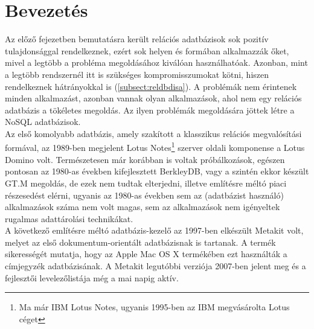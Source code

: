 \section{Bevezetés}

Az előző fejezetben bemutatásra került relációs adatbázisok sok pozitív tulajdonsággal rendelkeznek, ezért sok helyen és formában alkalmazzák őket, mivel a legtöbb a probléma megoldásához kiválóan használhatóak.
Azonban, mint a legtöbb rendszernél itt is szükséges kompromisszumokat kötni, hiszen rendelkeznek hátrányokkal is (\ref{subsect:reldbdisa}). A problémák nem érintenek minden alkalmazást, azonban vannak olyan alkalmazások, ahol nem egy relációs adatbázis a tökéletes megoldás. Az ilyen problémák megoldására jöttek létre a NoSQL adatbázisok.
\hfill\\
Az első komolyabb adatbázis, amely szakított a klasszikus relációs megvalósítási formával, az 1989-ben megjelent Lotus Notes\footnote{Ma már IBM Lotus Notes, ugyanis 1995-ben az IBM megvásárolta Lotus céget} szerver oldali komponense a Lotus Domino volt. Természetesen már korábban is voltak próbálkozások, egészen pontosan az 1980-as években kifejlesztett BerkleyDB, vagy a szintén ekkor készült GT.M megoldás, de ezek nem tudtak elterjedni, illetve említésre méltó piaci részesedést elérni, ugyanis az 1980-as években sem az (adatbázist használó) alkalmazások száma nem volt magas, sem az alkalmazások nem igényeltek rugalmas adattárolási technikákat.
\hfill\\
A következő említésre méltó adatbázis-kezelő az 1997-ben elkészült Metakit volt, melyet az első dokumentum-orientált adatbázisnak is tartanak. A termék sikerességét mutatja, hogy az Apple Mac OS X termékében ezt használták a címjegyzék adatbázisának. A Metakit legutóbbi verziója 2007-ben jelent meg és a fejlesztői levelezőlistája még a mai napig aktív.

